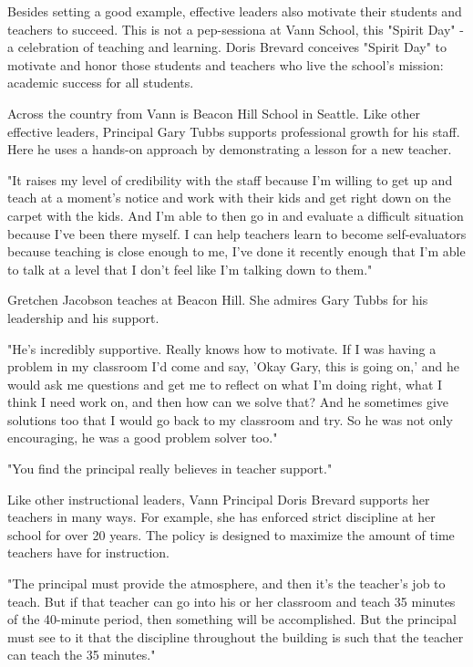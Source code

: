 Besides setting a good example, effective leaders also motivate their students and teachers to succeed. This is not a pep-sessiona at Vann School, this "Spirit Day" - a celebration of teaching and learning. Doris Brevard conceives "Spirit Day" to motivate and honor those students and teachers who live the school's mission: academic success for all students.

Across the country from Vann is Beacon Hill School in Seattle. Like other effective leaders, Principal Gary Tubbs supports professional growth for his staff. Here he uses a hands-on approach by demonstrating a lesson for a new teacher.

"It raises my level of credibility with the staff because I'm willing to get up and teach at a moment's notice and work with their kids and get right down on the carpet with the kids. And I'm able to then go in and evaluate a difficult situation because I've been there myself. I can help teachers learn to become self-evaluators because teaching is close enough to me, I've done it recently enough that I'm able to talk at a level that I don't feel like I'm talking down to them."

Gretchen Jacobson teaches at Beacon Hill. She admires Gary Tubbs for his leadership and his support.

"He's incredibly supportive. Really knows how to motivate. If I was having a problem in my classroom I'd come and say, 'Okay Gary, this is going on,' and he would ask me questions and get me to reflect on what I'm doing right, what I think I need work on, and then how can we solve that? And he sometimes give solutions too that I would go back to my classroom and try. So he was not only encouraging, he was a good problem solver too."

"You find the principal really believes in teacher support."

Like other instructional leaders, Vann Principal Doris Brevard supports her teachers in many ways. For example, she has enforced strict discipline at her school for over 20 years. The policy is designed to maximize the amount of time teachers have for instruction.

"The principal must provide the atmosphere, and then it's the teacher's job to teach. But if that teacher can go into his or her classroom and teach 35 minutes of the 40-minute period, then something will be accomplished. But the principal must see to it that the discipline throughout the building is such that the teacher can teach the 35 minutes."

